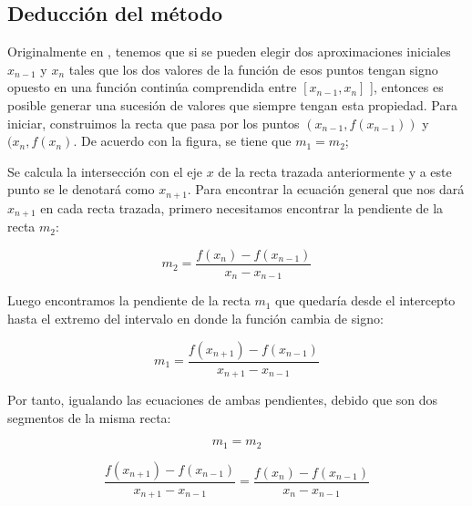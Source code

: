 \subsection{Deducción del método}

Originalmente en \cite{AN_Spanish}, tenemos que si se pueden elegir dos aproximaciones iniciales $ x_{n-1} $ y $ x_n $ tales que los dos valores de la función de esos puntos tengan signo opuesto en una función continúa comprendida entre $ [x_{n-1}, x_n] $ ], entonces es posible generar una sucesión de valores que siempre tengan esta propiedad.\newline\newline
Para iniciar, construimos la recta que pasa por los puntos $ (x_{n-1}, f(x_{n-1})) $ y $ (x_n, f(x_n) $. De acuerdo con la figura, se tiene que $ m_1 = m_2 $;\newline\newline


Se calcula la intersección con el eje $ x $ de la recta trazada anteriormente y a este punto se le denotará como $ x_{n+1} $.\newline\newline
Para encontrar la ecuación general que nos dará $ x_{n+1} $ en cada recta trazada, primero necesitamos encontrar la pendiente de la recta $ m_2 $:

\begin{displaymath}
    m_2 = \frac{f(x_n) - f(x_{n-1})}{x_n - x_{n-1}}
\end{displaymath}

Luego encontramos la pendiente de la recta $ m_1 $ que quedaría desde el intercepto hasta el extremo del intervalo en donde la función cambia de signo:

\begin{displaymath}
    m_1 = \frac{f(x_{n+1}) - f(x_{n-1})}{x_{n+1} - x_{n-1}}
\end{displaymath}

Por tanto, igualando las ecuaciones de ambas pendientes, debido que son dos segmentos de la misma recta:

\begin{displaymath}
    m_1 = m_2
\end{displaymath}

\begin{displaymath}
    \frac{f(x_{n+1}) - f(x_{n-1})}{x_{n+1} - x_{n-1}} = \frac{f(x_n) - f(x_{n-1})}{x_n - x_{n-1}}
\end{displaymath}

